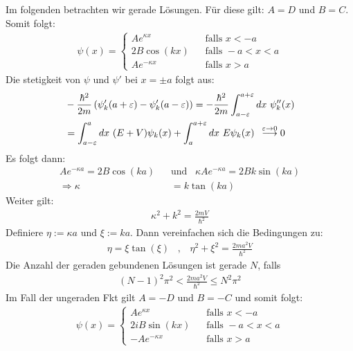 Im folgenden betrachten wir gerade Lösungen. Für diese gilt: $A=D$ und $B=C$.
Somit folgt:
\begin{align*}
    \psi(x) = \begin{cases}
        A e^{\kappa x} \hspace{10pt} &\text{falls } x < -a
        \\
        2 B \cos(kx) \hspace{10pt} &\text{falls } -a < x < a
        \\
        A e^{- \kappa x} \hspace{10pt} &\text{falls } x > a
    \end{cases}
\end{align*}
Die stetigkeit von $\psi$ und $\psi'$ bei $x = \pm a$ folgt aus:
\begin{align*}
    &- \frac{\hbar^2}{2m} \klammer{\psi_k' (a+\epsilon) - \psi_k'(a-\epsilon)}
    = - \frac{\hbar^2}{2m} \int_{a-\epsilon}^{a+\epsilon} dx \ \psi_k''(x)
    \\
    &= \int_{a-\epsilon}^a dx \ (E+V) \psi_k (x) + \int_a^{a+\epsilon} dx \ E \psi_k(x)
    \hspace{5pt} \stackrel{\epsilon \rightarrow 0}{\longrightarrow} 0
\end{align*}
Es folgt dann:
\begin{align*}
    A e^{-\kappa a} = 2B \cos(k a)
    \hspace{10pt} &\text{und} \hspace{10pt}
    \kappa A e^{-\kappa a} = 2 B k \sin(k a)
    \\
    \Rightarrow \kappa &= k \tan(k a)
\end{align*}
Weiter gilt:
\begin{align*}
    \kappa^2 + k^2 = \frac{2 m V}{\hbar^2}
\end{align*}
Definiere $\eta := \kappa a$ und $\xi := k a$. Dann vereinfachen sich die
Bedingungen zu:
\begin{align*}
    \eta = \xi \tan(\xi)
    \hspace{10pt} , \hspace{10pt}
    \eta^2 + \xi^2 = \frac{2 m a^2 V}{\hbar^2}
\end{align*}
Die Anzahl der geraden gebundenen Lösungen ist gerade $N$, falls
\begin{align*}
    (N-1)^2 \pi^2 < \frac{2ma^2 V}{\hbar^2} \leq N^2 \pi^2
\end{align*}
Im Fall der ungeraden Fkt gilt $A=-D$ und $B=-C$ und somit folgt:
\begin{align*}
    \psi(x) = \begin{cases}
        A e^{\kappa x} \hspace{10pt} &\text{falls } x < -a
        \\
        2 i B \sin(k x) \hspace{10pt} &\text{falls } -a < x < a
        \\
        -A e^{- \kappa x} \hspace{10pt} &\text{falls } x > a
    \end{cases}
\end{align*}
